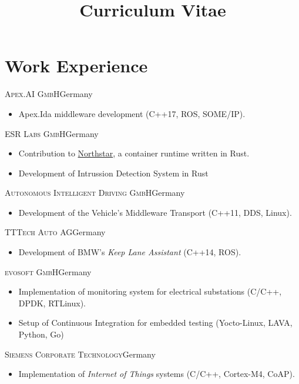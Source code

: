 \documentclass[10pt]{moderncv}
\title{Curriculum Vitae}
\begin{document}
\maketitle

\section{Work Experience}

{\textsc{Apex.AI GmbH}}{Germany}{}{%
\begin{itemize}
    \item Apex.Ida middleware development (C++17, ROS, SOME/IP).
\end{itemize}
}

{\textsc{ESR Labs GmbH}}{Germany}{}{%
\begin{itemize}
    \item Contribution to
        \href{https://github.com/esrlabs/northstar}{Northstar}, a container
        runtime written in Rust.
    \item Development of Intrussion Detection System in Rust
\end{itemize}
}

{\textsc{Autonomous Intelligent Driving GmbH}}{Germany}{}{%
\begin{itemize}
  \item Development of the Vehicle's Middleware Transport (C++11, DDS, Linux).
\end{itemize}
}

{\textsc{TTTech Auto AG}}{Germany}{}{%
\begin{itemize}
  \item Development of BMW's \textit{Keep Lane Assistant} (C++14, ROS).
\end{itemize}
}

{\textsc{evosoft GmbH}}{Germany}{}{%
\begin{itemize}
  \item Implementation of monitoring system for electrical substations
    (C/C++, DPDK, RTLinux).
  \item Setup of Continuous Integration for embedded testing (Yocto-Linux,
    LAVA, Python, Go)
\end{itemize}
}

{\textsc{Siemens Corporate Technology}}{Germany}{}{%
\begin{itemize}
  \item Implementation of \textit{Internet of Things} systems (C/C++, Cortex-M4, CoAP).
\end{itemize}
}
\end{document}
